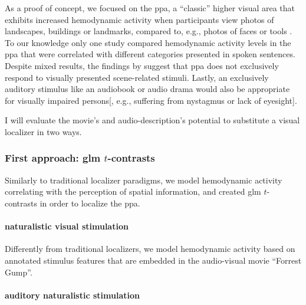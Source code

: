 As a proof of concept, we focused on the \ac{ppa}, a ``classic'' higher visual
area that exhibits increased hemodynamic activity when participants view photos
of landscapes, buildings or landmarks, compared to, e.g., photos of faces or
tools \citep[e.g.,][for reviews]{epstein2014neural, aminoff2013role}.
To our knowledge only one study \citep[cf.][]{aziz2008modulation} compared
hemodynamic activity levels in the \ac{ppa} that were correlated with different
categories presented in spoken sentences.
%
Despite mixed results, the findings by \citet{aziz2008modulation} suggest that
\ac{ppa} does not exclusively respond to visually presented scene-related
stimuli.
Lastly, an exclusively auditory stimulus like an audiobook or audio drama would
also be appropriate for visually impaired persons[, e.g., suffering from
nystagmus or lack of eyesight].


%
I will evaluate the movie's and audio-description's potential to substitute a
visual localizer in two ways.


\subsubsection{First approach: \ac{glm} $t$-contrasts}


Similarly to traditional localizer paradigms, we model hemodynamic activity
correlating with the perception of spatial information, and created \ac{glm}
$t$-contrasts in order to localize the \ac{ppa}.


\paragraph{naturalistic visual stimulation}



Differently from traditional localizers, we model hemodynamic activity based on
annotated stimulus features that are embedded in the audio-visual movie
``Forrest Gump''.


\paragraph{auditory naturalistic stimulation}

